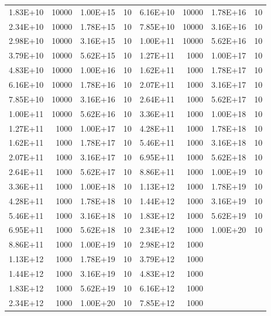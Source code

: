 \begin{table}
\begin{center}
\begin{tabular}{l r l r | l r l r}
		1.83E+10    & 10000   & 1.00E+15    & 10      & 6.16E+10    & 10000   & 1.78E+16    & 10      \\
		2.34E+10    & 10000   & 1.78E+15    & 10      & 7.85E+10    & 10000   & 3.16E+16    & 10      \\
		2.98E+10    & 10000   & 3.16E+15    & 10      & 1.00E+11    & 10000   & 5.62E+16    & 10      \\
		3.79E+10    & 10000   & 5.62E+15    & 10      & 1.27E+11    & 1000    & 1.00E+17    & 10      \\
		4.83E+10    & 10000   & 1.00E+16    & 10      & 1.62E+11    & 1000    & 1.78E+17    & 10      \\
		6.16E+10    & 10000   & 1.78E+16    & 10      & 2.07E+11    & 1000    & 3.16E+17    & 10      \\
		7.85E+10    & 10000   & 3.16E+16    & 10      & 2.64E+11    & 1000    & 5.62E+17    & 10      \\
		1.00E+11    & 10000   & 5.62E+16    & 10      & 3.36E+11    & 1000    & 1.00E+18    & 10      \\
		1.27E+11    & 1000    & 1.00E+17    & 10      & 4.28E+11    & 1000    & 1.78E+18    & 10      \\
		1.62E+11    & 1000    & 1.78E+17    & 10      & 5.46E+11    & 1000    & 3.16E+18    & 10      \\
		2.07E+11    & 1000    & 3.16E+17    & 10      & 6.95E+11    & 1000    & 5.62E+18    & 10      \\
		2.64E+11    & 1000    & 5.62E+17    & 10      & 8.86E+11    & 1000    & 1.00E+19    & 10      \\
		3.36E+11    & 1000    & 1.00E+18    & 10      & 1.13E+12    & 1000    & 1.78E+19    & 10      \\
		4.28E+11    & 1000    & 1.78E+18    & 10      & 1.44E+12    & 1000    & 3.16E+19    & 10      \\
		5.46E+11    & 1000    & 3.16E+18    & 10      & 1.83E+12    & 1000    & 5.62E+19    & 10      \\
		6.95E+11    & 1000    & 5.62E+18    & 10      & 2.34E+12    & 1000    & 1.00E+20    & 10      \\
		8.86E+11    & 1000    & 1.00E+19    & 10      & 2.98E+12    & 1000    &             &         \\
		1.13E+12    & 1000    & 1.78E+19    & 10      & 3.79E+12    & 1000    &             &         \\
		1.44E+12    & 1000    & 3.16E+19    & 10      & 4.83E+12    & 1000    &             &         \\
		1.83E+12    & 1000    & 5.62E+19    & 10      & 6.16E+12    & 1000    &             &         \\
		2.34E+12    & 1000    & 1.00E+20    & 10      & 7.85E+12    & 1000    &             &         \\   
		\hline
	\end{tabular}
	\end{center}
\end{table}